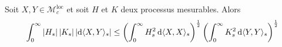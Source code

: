 	\begin{thm}
		Soit $X,Y \in \mathcal{M}^{\text{loc}}_c$ et soit $H$ et $K$ deux processus mesurables.
		Alors
		$$\int_0^\infty \left\lvert H_s\right\rvert \left\lvert K_s\right\rvert \left\lvert\mathop{}\mathopen{}\mathrm{d} \langle X,Y \rangle_s\right\rvert \leq
			\left( \int_0^\infty H_s^2 \mathop{}\mathopen{}\mathrm{d} \langle X,X \rangle_s \right)^{\frac{1}{2}}
			\left( \int_0^\infty K_s^2 \mathop{}\mathopen{}\mathrm{d} \langle Y,Y \rangle_s \right)^{\frac{1}{2}}$$
	\end{thm}